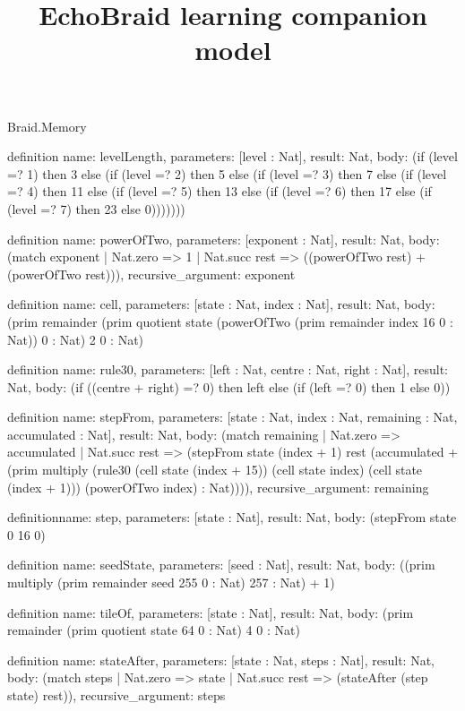 \begin{lexlean}{Braid.Memory}
\title{EchoBraid learning companion model}
\begin{semanticmodule}
definition{
  name: levelLength,
  parameters: [level : Nat],
  result: Nat,
  body: (if (level =? 1) then 3 else (if (level =? 2) then 5 else (if (level =? 3) then 7 else (if (level =? 4) then 11 else (if (level =? 5) then 13 else (if (level =? 6) then 17 else (if (level =? 7) then 23 else 0)))))))
}

definition{
  name: powerOfTwo,
  parameters: [exponent : Nat],
  result: Nat,
  body: (match exponent | Nat.zero => 1 | Nat.succ rest => ((powerOfTwo rest) + (powerOfTwo rest))),
  recursive_argument: exponent
}

definition{
  name: cell,
  parameters: [state : Nat, index : Nat],
  result: Nat,
  body: (prim remainder (prim quotient state (powerOfTwo (prim remainder index 16 0 : Nat)) 0 : Nat) 2 0 : Nat)
}

definition{
  name: rule30,
  parameters: [left : Nat, centre : Nat, right : Nat],
  result: Nat,
  body: (if ((centre + right) =? 0) then left else (if (left =? 0) then 1 else 0))
}

definition{
  name: stepFrom,
  parameters: [state : Nat, index : Nat, remaining : Nat, accumulated : Nat],
  result: Nat,
  body: (match remaining
    | Nat.zero => accumulated
    | Nat.succ rest => (stepFrom state (index + 1) rest (accumulated + (prim multiply (rule30 (cell state (index + 15)) (cell state index) (cell state (index + 1))) (powerOfTwo index) : Nat)))),
  recursive_argument: remaining
}

definition{name: step, parameters: [state : Nat], result: Nat, body: (stepFrom state 0 16 0)}

definition{
  name: seedState,
  parameters: [seed : Nat],
  result: Nat,
  body: ((prim multiply (prim remainder seed 255 0 : Nat) 257 : Nat) + 1)
}

definition{
  name: tileOf,
  parameters: [state : Nat],
  result: Nat,
  body: (prim remainder (prim quotient state 64 0 : Nat) 4 0 : Nat)
}

definition{
  name: stateAfter,
  parameters: [state : Nat, steps : Nat],
  result: Nat,
  body: (match steps | Nat.zero => state | Nat.succ rest => (stateAfter (step state) rest)),
  recursive_argument: steps
}


\end{semanticmodule}
\end{lexlean}
